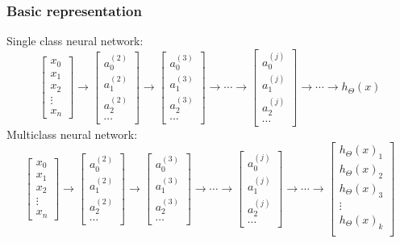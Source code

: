 \documentclass[12pt]{article}
\begin{document}
\subsubsection{Basic representation}
Single class neural network:
\begin{equation}
\begin{bmatrix}
x_0\\x_1\\x_2\\ \vdots \\x_n
\end{bmatrix} \rightarrow \begin{bmatrix}
a_0^{(2)}\\a_1^{(2)}\\a_2^{(2)}\\ \cdots 
\end{bmatrix} \rightarrow \begin{bmatrix}
a_0^{(3)}\\a_1^{(3)}\\a_2^{(3)}\\ \cdots 
\end{bmatrix} \rightarrow \cdots \rightarrow \begin{bmatrix}
a_0^{(j)}\\a_1^{(j)}\\a_2^{(j)}\\ \cdots 
\end{bmatrix} \rightarrow \cdots \rightarrow h_{\Theta}(x)
\end{equation}
Multiclass neural network:
\begin{equation}
\begin{bmatrix}
x_0\\x_1\\x_2\\ \vdots \\x_n
\end{bmatrix} \rightarrow \begin{bmatrix}
a_0^{(2)}\\a_1^{(2)}\\a_2^{(2)}\\ \cdots 
\end{bmatrix} \rightarrow \begin{bmatrix}
a_0^{(3)}\\a_1^{(3)}\\a_2^{(3)}\\ \cdots 
\end{bmatrix} \rightarrow \cdots \rightarrow \begin{bmatrix}
a_0^{(j)}\\a_1^{(j)}\\a_2^{(j)}\\ \cdots 
\end{bmatrix} \rightarrow \cdots \rightarrow \begin{bmatrix}
h_{\Theta}(x)_1\\ h_{\Theta}(x)_2\\ h_{\Theta}(x)_3\\ \vdots \\ h_{\Theta}(x)_k\\ 
\end{bmatrix}
\end{equation}
\end{document}
